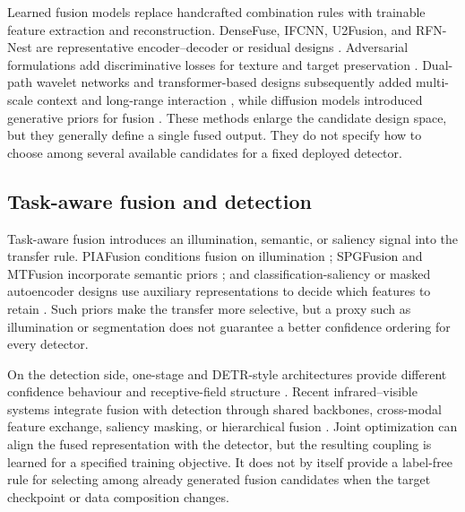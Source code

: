 \documentclass[preprint,11pt]{elsarticle}
\begin{document}
Learned fusion models replace handcrafted combination rules with trainable
feature extraction and reconstruction. DenseFuse, IFCNN, U2Fusion, and
RFN-Nest are representative encoder--decoder or residual designs
\cite{li2019densefuse,zhang2020,xu2022u2fusion,li2021rfn}. Adversarial
formulations add discriminative losses for texture and target preservation
\cite{ma2019fusiongan,hou2021ssgan,yi2021dfpgan,song2022tdgan}. Dual-path
wavelet networks and transformer-based designs subsequently added multi-scale
context and long-range interaction \cite{liu2023dualpath,hao2022vdfefuse,yang2023dglt,an2024mras},
while diffusion models introduced generative priors for fusion
\cite{yi2024diffif,yang2025lfdt}. These methods enlarge the candidate design
space, but they generally define a single fused output. They do not specify how
to choose among several available candidates for a fixed deployed detector.

\subsection{Task-aware fusion and detection}

Task-aware fusion introduces an illumination, semantic, or saliency signal into
the transfer rule. PIAFusion conditions fusion on illumination
\cite{tang2022}; SPGFusion and MTFusion incorporate semantic priors
\cite{zhang2026,zhou2026mtfusion}; and classification-saliency or masked
autoencoder designs use auxiliary representations to decide which features to
retain \cite{xu2021classsaliency,wang2025smae}. Such priors make the transfer
more selective, but a proxy such as illumination or segmentation does not
guarantee a better confidence ordering for every detector.

On the detection side, one-stage and DETR-style architectures provide different
confidence behaviour and receptive-field structure \cite{redmon2016yolo,wang2024yolov9,wang2024yolov10,zhao2024rtdetr}.
Recent infrared--visible systems integrate fusion with detection through shared
backbones, cross-modal feature exchange, saliency masking, or hierarchical
fusion \cite{zhao2025cmifdf,gao2026coifsd,an2026mrtdetr,zhang2026hffn,xiang2025unifusod,yue2022lowlight}.
Joint optimization can align the fused representation with the detector, but
the resulting coupling is learned for a specified training objective. It does
not by itself provide a label-free rule for selecting among already generated
fusion candidates when the target checkpoint or data composition changes.
\end{document}
